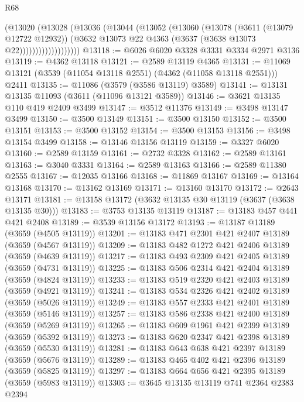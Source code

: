\begin{lexlean}{R68}
\begin{coremodule}
                      (@13020
                        (@13028
                          (@13036
                            (@13044
                              (@13052
                                (@13060
                                  (@13078
                                    (@3611 (@13079 @12722 @12932))
                                    (@3632
                                      @13073
                                      @22
                                      @4363
                                      (@3637 (@3638 @13073 @22)))))))))))))))))))
@13118 := @6026 @6020 @3328 @3331 @3334 @2971 @3136
@13119 := @4362 @13118
@13121 := @2589 @13119 @4365
@13131 := @11069 @13121 (@3539 (@11054 @13118 @2551) (@4362 (@11058 @13118 @2551))) @2411
@13135 := @11086 (@3579 (@3586 @13119) @3589)
@13141 := @13131 @13135 @11093 (@3611 (@11096 @13121 @3589))
@13146 := @3621 @13135 @110 @419 @2409 @3499
@13147 := @3512 @11376
@13149 := @3498 @13147 @3499
@13150 := @3500 @13149
@13151 := @3500 @13150
@13152 := @3500 @13151
@13153 := @3500 @13152
@13154 := @3500 @13153
@13156 := @3498 @13154 @3499
@13158 := @13146 @13156 @13119
@13159 := @3327 @6020
@13160 := @2589 @13159
@13161 := @2732 @3328
@13162 := @2589 @13161
@13163 := @3040 @3331
@13164 := @2589 @13163
@13166 := @2589 @11380 @2555
@13167 := @12035 @13166
@13168 := @11869 @13167
@13169 := @13164 @13168
@13170 := @13162 @13169
@13171 := @13160 @13170
@13172 := @2643 @13171
@13181 := @13158 @13172 (@3632 @13135 @30 @13119 (@3637 (@3638 @13135 @30)))
@13183 := @3753 @13135 @13119
@13187 := @13183 @457 @441 @421 @2408
@13189 := @3539 @13156 @13172
@13193 := @13187 @13189 (@3659 (@4505 @13119))
@13201 := @13183 @471 @2301 @421 @2407 @13189 (@3659 (@4567 @13119))
@13209 := @13183 @482 @1272 @421 @2406 @13189 (@3659 (@4639 @13119))
@13217 := @13183 @493 @2309 @421 @2405 @13189 (@3659 (@4731 @13119))
@13225 := @13183 @506 @2314 @421 @2404 @13189 (@3659 (@4824 @13119))
@13233 := @13183 @519 @2320 @421 @2403 @13189 (@3659 (@4921 @13119))
@13241 := @13183 @534 @2326 @421 @2402 @13189 (@3659 (@5026 @13119))
@13249 := @13183 @557 @2333 @421 @2401 @13189 (@3659 (@5146 @13119))
@13257 := @13183 @586 @2338 @421 @2400 @13189 (@3659 (@5269 @13119))
@13265 := @13183 @609 @1961 @421 @2399 @13189 (@3659 (@5392 @13119))
@13273 := @13183 @620 @2347 @421 @2398 @13189 (@3659 (@5530 @13119))
@13281 := @13183 @643 @638 @421 @2397 @13189 (@3659 (@5676 @13119))
@13289 := @13183 @465 @402 @421 @2396 @13189 (@3659 (@5825 @13119))
@13297 := @13183 @664 @656 @421 @2395 @13189 (@3659 (@5983 @13119))
@13303 := @3645 @13135 @13119 @741 @2364 @2383 @2394

\end{coremodule}
\end{lexlean}
